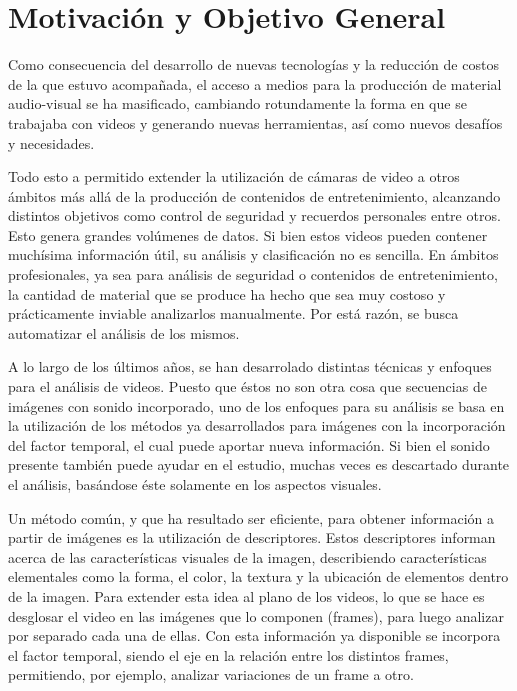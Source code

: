 \section{Motivación y Objetivo General}
\iffalse
Explique el problema o situación de referencia en el que se desarrolla la
propuesta o los interrogantes en el campo disciplinario a los que la propuesta se
dirige. Desarrolle la importancia e impacto de los objetivos y el conocimiento
que se generará. En esta sección no es necesario describir las tareas específicas
que se realizarán (para eso, ver Objetivos específicos).
\fi

Como consecuencia del desarrollo de nuevas tecnologías y la reducción de costos de la que estuvo acompañada, el acceso a medios para la 
producción de material audio-visual se ha masificado, cambiando rotundamente la forma en que se trabajaba con videos y generando nuevas
herramientas, así como nuevos desafíos y necesidades.

Todo esto a permitido extender la utilización de cámaras de video a otros ámbitos más allá de la producción de contenidos de entretenimiento,
alcanzando distintos objetivos como control de seguridad y recuerdos personales entre otros. Esto genera grandes volúmenes de datos.
Si bien estos videos pueden contener muchísima información útil, su análisis y clasificación no es sencilla. En ámbitos profesionales,
ya sea para análisis de seguridad o contenidos de entretenimiento, la cantidad de material que se produce ha hecho que sea muy costoso y prácticamente
inviable analizarlos manualmente. Por está razón, se busca automatizar el análisis de los mismos.

A lo largo de los últimos años, se han desarrolado distintas técnicas y enfoques para el análisis de videos.
Puesto que éstos no son otra cosa que secuencias de imágenes con sonido incorporado, uno de los enfoques para su análisis
se basa en la utilización de los métodos ya desarrollados para imágenes con la incorporación del factor temporal, el cual puede
aportar nueva información. Si bien el sonido presente también puede ayudar en el estudio, muchas veces es descartado durante el análisis,
basándose éste solamente en los aspectos visuales.

Un método común, y que ha resultado ser eficiente, para obtener información a partir de imágenes es la utilización de descriptores.
Estos descriptores informan acerca de las características visuales de la imagen, describiendo características elementales como la forma, el color,
la textura y la ubicación de elementos dentro de la imagen.
Para extender esta idea al plano de los videos, lo que se hace es desglosar el video en las imágenes que lo componen (frames), para luego analizar por separado
cada una de ellas. Con esta información ya disponible se incorpora el factor temporal, siendo el eje en la relación entre los distintos frames, permitiendo,
por ejemplo, analizar variaciones de un frame a otro.
